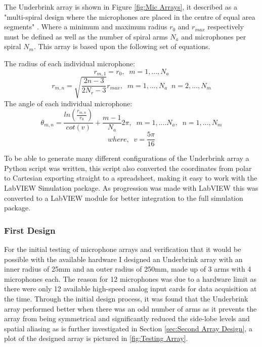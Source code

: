 \documentclass{UoNMCHA}
\numberwithin{equation}{section}
\begin{document}
    The Underbrink array is shown in Figure \ref{fig:Mic Arrays}, it described as a "multi-spiral design where the microphones are placed in the centre of equal area segments" \citep{Pri13}. Where a minimum and maximum radius $r_0$ and $r_{max}$ respectively must be defined as well as the number of spiral arms $N_a$ and microphones per spiral $N_m$. This array is based upon the following set of equations.
    
    The radius of each individual microphone:
    \begin{equation}
        r_{m,1} = r_0,\;\;m=1,...,N_a
    \end{equation}
    \begin{equation*}
        r_{m,n}=\sqrt{\frac{2n-3}{2N_r-3}}r_{max},\;\;m=1,...,N_a\;\;n=2,...,N_m
    \end{equation*}
    The angle of each individual microphone:
    \begin{equation}
        \theta_{m,n} = \frac{ln(\frac{r_{m,n}}{r_0})}{cot(v)} + \frac{m-1}{N_a}2\pi,\;\;m=1,....N_a,\;\;n=1,...,N_m
    \end{equation}
    \begin{equation*}
        where,\;\;v=\frac{5\pi}{16}
    \end{equation*}
    
    To be able to generate many different configurations of the Underbrink array a Python script was written, this script also converted the coordinates from polar to Cartesian exporting straight to a spreadsheet, making it easy to work with the LabVIEW Simulation package. As progression was made with LabVIEW this was converted to a LabVIEW module for better integration to the full simulation package. 
\subsubsection{First Design} \label{sec:First Array Design}
    For the initial testing of microphone arrays and verification that it would be possible with the available hardware I designed an Underbrink array with an inner radius of 25mm and an outer radius of 250mm, made up of 3 arms with 4 microphones each. The reason for 12 microphones was due to a hardware limit as there were only 12 available high-speed analog input cards for data acquisition at the time. Through the initial design process, it was found that the Underbrink array performed better when there was an odd number of arms as it prevents the array from being symmetrical and significantly reduced the side-lobe levels and spatial aliasing as is further investigated in Section \ref{sec:Second Array Design}, a plot of the designed array is pictured in \ref{fig:Testing Array}.
    
\end{document}
